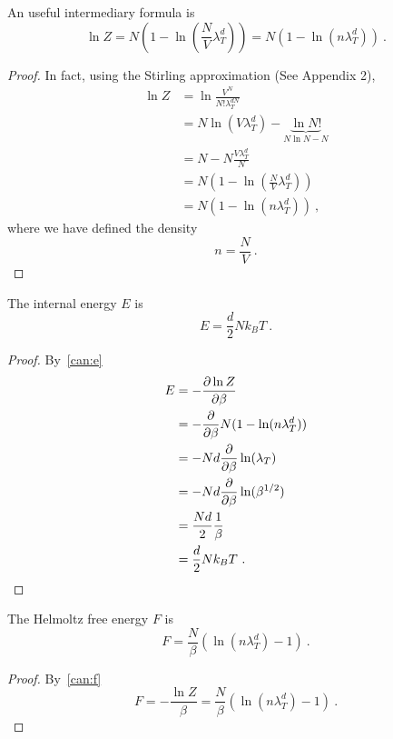     An useful intermediary formula is 
    \begin{equation*}
        \ln Z = N (1 - \ln (\frac{N}{V} \lambda_T^d)) = N (1 - \ln (n \lambda_T^d)) ~.
    \end{equation*}
    \begin{proof}
        In fact, using the Stirling approximation (See Appendix 2),
        \begin{equation*}
        \begin{aligned}
            \ln Z & = \ln \frac{V^N}{N! \lambda^{dN}_T} \\ & = N \ln (V \lambda_T^d) - \underbrace{\ln N!}_{N \ln N - N} \\ & = N - N \frac{V \lambda_T^d}{N} \\ & = N (1 - \ln (\frac{N}{V} \lambda_T^d)) \\ & = N (1 - \ln (n \lambda_T^d))  ~,
        \end{aligned}
        \end{equation*}
        where we have defined the density
        \begin{equation*}
            n = \frac{N}{V} ~.
        \end{equation*}
    \end{proof}
    
    The internal energy $E$ is 
    \begin{equation*}
        E = \frac{d}{2} N k_B T ~.
    \end{equation*}
    \begin{proof}
        By~\eqref{can:e}
        \begin{equation*}
        \begin{aligned}
            E & = - \frac{\partial\ln Z}{\partial\beta} \\ & = - \frac{\partial}{\partial\beta} N (1 - \ln (n \lambda_T^d)) \\ & = - Nd \frac{\partial}{\partial\beta} \ln (\lambda_T) \\ & = - Nd \frac{\partial}{\partial\beta} \ln (\beta^{1/2}) \\ & = \frac{Nd}{2} \frac{1}{\beta} \\ & = \frac{d}{2} N k_B T ~.
        \end{aligned}
        \end{equation*}
    \end{proof}
    
    The Helmoltz free energy $F$ is 
    \begin{equation*}
        F = \frac{N}{\beta} (\ln (n \lambda_T^d) - 1) ~.
    \end{equation*}
    \begin{proof}
        By~\eqref{can:f}
        \begin{equation*}
            F = - \frac{\ln Z}{\beta} = \frac{N}{\beta} (\ln (n \lambda_T^d) - 1) ~.
        \end{equation*}
    \end{proof}
    
